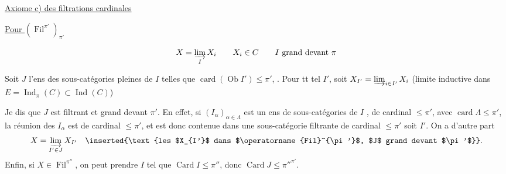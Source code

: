 \uline{Axiome c) des filtrations cardinales}

\uline{Pour $(\operatorname{Fil}^{\pi'})_{\pi'}$}


\[
 X=\varinjlim_I X_i\qquad X_i\in C\qquad I\text{ grand devant }\pi
\]

Soit $J$ l'ens des sous-catégories pleines  de $I$  telles que $\operatorname{card}(\operatorname{Ob}I')\leq\pi'$,  . Pour tt tel $I'$, soit $X_{I'}=\varinjlim_{i\in I'}X_i$ (limite inductive dans $E=\operatorname{Ind}_\pi(C)\subset\operatorname{Ind}(C)$) 

Je dis que $J$ est filtrant et grand devant $\pi'$. En effet, si $(I_\alpha)_{\alpha\in\Lambda}$ est un ens de sous-catégories de $I$ , de cardinal $\leq\pi'$, avec $\operatorname{card}\Lambda\leq\pi'$, la réunion  des $I_\alpha$ est de cardinal $\leq\pi'$, et  est donc contenue dans une sous-catégorie filtrante de cardinal $\leq\pi'$\unsure{;}  soit $I'$.  On a d'autre part
\[
 X=\varinjlim_{I'\in J}X_{I'}\quad\inserted{\text{les $X_{I'}$ dans $\operatorname{Fil}^{\pi'}$, $J$ grand devant $\pi'$}}.
\]
Enfin, si $X\in\operatorname{Fil}^{\pi''}$, on peut prendre  $I$ tel que $\operatorname{Card} I\leq\pi''$, donc $\operatorname{Card} J\leq{\pi''}^{\pi'}$.


